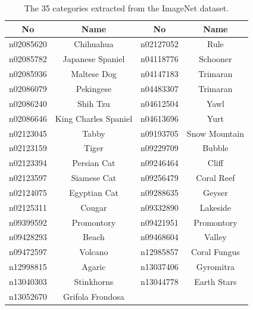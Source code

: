 \documentclass[12pt]{report}
\begin{document}
\begin{table}[htbp]
  \centering
  \caption{The 35 categories extracted from the ImageNet dataset.}
  \label{tab:35categories}
  \begin{tabular}{c c|c c}
    No&Name&No&Name  \\
    \hline
    n02085620 & Chihuahua             & n02127052 & Rule          \\
    n02085782 & Japanese Spaniel      & n04118776 & Schooner      \\
    n02085936 & Maltese Dog           & n04147183 & Trimaran      \\
    n02086079 & Pekingese             & n04483307 & Trimaran      \\
    n02086240 & Shih Tzu              & n04612504 & Yawl          \\
    n02086646 & King Charles Spaniel  & n04613696 & Yurt          \\
    n02123045 & Tabby                 & n09193705 & Snow Mountain \\
    n02123159 & Tiger                 & n09229709 & Bubble        \\
    n02123394 & Persian Cat           & n09246464 & Cliff         \\
    n02123597 & Siamese Cat           & n09256479 & Coral Reef    \\
    n02124075 & Egyptian Cat          & n09288635 & Geyser        \\
    n02125311 & Cougar                & n09332890 & Lakeside      \\
    n09399592 & Promontory            & n09421951 & Promontory    \\
    n09428293 & Beach                 & n09468604 & Valley        \\
    n09472597 & Volcano               & n12985857 & Coral Fungus  \\
    n12998815 & Agaric                & n13037406 & Gyromitra     \\
    n13040303 & Stinkhorns            & n13044778 & Earth Stars   \\
    n13052670 & Grifola Frondosa      &           &               \\
  \end{tabular}
\end{table}
\end{document}
